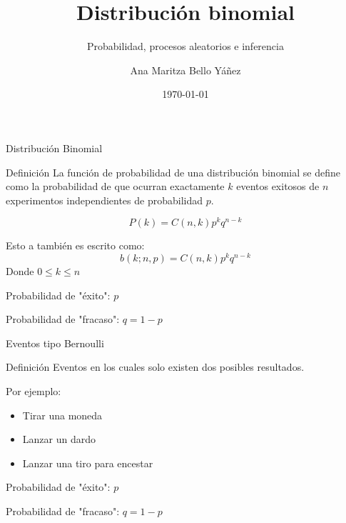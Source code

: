 \documentclass{beamer}
\title[ \hspace{21mm} \insertframenumber \ de \inserttotalframenumber ]
{Distribución binomial}
\subtitle
{Probabilidad, procesos aleatorios e inferencia}
\author[]
{Ana Maritza Bello Yáñez}
\institute[Instituto Polit\'ecnico Nacional]
{
  \inst{1}
  Centro de Investigaci\'on en Computaci\'on
  }
\date[Short Occasion]
{\today}
\begin{document}

\begin{frame}
  \titlepage
\end{frame}

\begin{frame}{Distribución Binomial}
  \begin{block}{Definición}
    La función de probabilidad de una distribución binomial se define como la
    probabilidad de que ocurran exactamente $k$ eventos exitosos de $n$ experimentos
    independientes de probabilidad $p$.

    \begin{equation}
      P(k) = C(n,k) p^k q^{n-k}
    \end{equation}
    
    Esto a también es escrito como:
    \begin{equation}
      b(k; n,p) = C(n,k) p^k q^{n-k}
    \end{equation}
    Donde $0 \leq k \leq n$
  \end{block}
  \begin{block}{}
    Probabilidad de "éxito": $p$

    Probabilidad de "fracaso": $q = 1 - p$
  \end{block}
\end{frame}

\begin{frame}{Eventos tipo Bernoulli}
  \begin{block}{Definición}
    Eventos en los cuales solo existen dos posibles resultados.

    Por ejemplo:

    \begin{itemize}
      \item Tirar una moneda
      \item Lanzar un dardo
      \item Lanzar una tiro para encestar
    \end{itemize}
  \end{block}

  \begin{block}{}
    Probabilidad de "éxito": $p$

    Probabilidad de "fracaso": $q = 1 - p$
  \end{block}

\end{frame}
\end{document}
